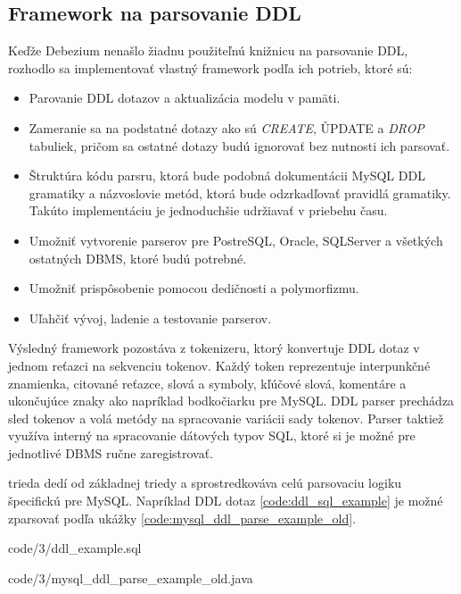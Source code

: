 \subsection{Framework na parsovanie DDL}
Keďže Debezium nenašlo žiadnu použiteľnú knižnicu na parsovanie DDL, rozhodlo sa implementovať vlastný framework podľa ich potrieb, ktoré sú\cite{debezium:parse_ddl}:
\begin{itemize}
\item Parovanie DDL dotazov a aktualizácia modelu v pamäti. 
\item Zameranie sa na podstatné dotazy ako sú \textit{CREATE}, \v{UPDATE} a \textit{DROP} tabuliek, pričom sa ostatné dotazy budú ignorovať bez nutnosti ich parsovať.
\item Štruktúra kódu parsru, ktorá bude podobná dokumentácii MySQL DDL gramatiky a názvoslovie metód, ktorá bude odzrkadľovať pravidlá gramatiky. Takúto implementáciu je jednoduchšie udržiavať v priebehu času.
\item Umožniť vytvorenie parserov pre PostreSQL, Oracle, SQLServer a všetkých ostatných DBMS, ktoré budú potrebné.
\item Umožniť prispôsobenie pomocou dedičnosti a polymorfizmu.
\item Uľahčiť vývoj, ladenie a testovanie parserov.
\end{itemize}

Výsledný framework pozostáva z tokenizeru, ktorý konvertuje DDL dotaz v jednom reťazci na sekvenciu tokenov. Každý token reprezentuje interpunkčné znamienka, citované reťazce, slová a symboly, kľúčové slová, komentáre a ukončujúce znaky ako napríklad bodkočiarku pre MySQL. DDL parser prechádza sled tokenov a volá metódy na spracovanie variácii sady tokenov. Parser taktiež využíva interný  na spracovanie dátových typov SQL, ktoré si je možné pre jednotlivé DBMS ručne zaregistrovať.

 trieda dedí od základnej triedy  a sprostredkováva celú parsovaciu logiku špecifickú pre MySQL. Napríklad DDL dotaz \ref{code:ddl_sql_example} je možné zparsovať podľa ukážky \ref{code:mysql_ddl_parse_example_old}.


            {code/3/ddl_example.sql}
            

            {code/3/mysql_ddl_parse_example_old.java}
            

